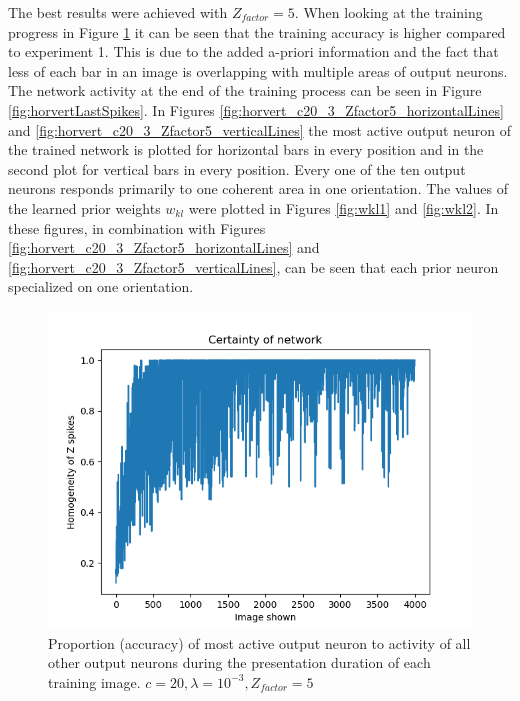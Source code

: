 The best results were achieved with $Z_{factor} = 5$. When looking at the training progress in Figure \ref{fig:horvert_c20_3_Zfactor5_averageZ} it can be seen that the training accuracy is higher compared to experiment 1. This is due to the added a-priori information and the fact that less of each bar in an image is overlapping with multiple areas of output neurons. The network activity at the end of the training process can be seen in Figure \ref{fig:horvertLastSpikes}. In Figures \ref{fig:horvert_c20_3_Zfactor5_horizontalLines} and \ref{fig:horvert_c20_3_Zfactor5_verticalLines} the most active output neuron of the trained network is plotted for horizontal bars in every position and in the second plot for vertical bars in every position. Every one of the ten output neurons responds primarily to one coherent area in one orientation. The values of the learned prior weights $w_{kl}$ were plotted in Figures \ref{fig:wkl1} and \ref{fig:wkl2}. In these figures, in combination with Figures \ref{fig:horvert_c20_3_Zfactor5_horizontalLines} and \ref{fig:horvert_c20_3_Zfactor5_verticalLines}, can be seen that each prior neuron specialized on one orientation.

\begin{figure}
  \includegraphics[width=\linewidth]{figures/horvert/horvert_c20_3_Zfactor5_averageZ.png}
  \caption{Proportion (accuracy) of most active output neuron  to activity of all other output neurons during the presentation duration of each training image. $c = 20, \lambda = 10^{-3}, Z_{factor} = 5$}
  \label{fig:horvert_c20_3_Zfactor5_averageZ}
\end{figure}

